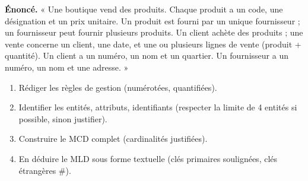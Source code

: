 \documentclass[11pt]{article}
\begin{document}
\begin{exercice}
\textbf{Énoncé.} « Une boutique vend des produits. Chaque produit a un code, une désignation et un prix unitaire. Un produit est fourni par un unique fournisseur ; un fournisseur peut fournir plusieurs produits. Un client achète des produits ; une vente concerne un client, une date, et une ou plusieurs lignes de vente (produit + quantité). Un client a un numéro, un nom et un quartier. Un fournisseur a un numéro, un nom et une adresse. »
\begin{enumerate}
\item Rédiger les règles de gestion (numérotées, quantifiées).
\item Identifier les entités, attributs, identifiants (respecter la limite de 4 entités si possible, sinon justifier).
\item Construire le MCD complet (cardinalités justifiées).
\item En déduire le MLD sous forme textuelle (clés primaires soulignées, clés étrangères \#).
\end{enumerate}
\end{exercice}
\end{document}
